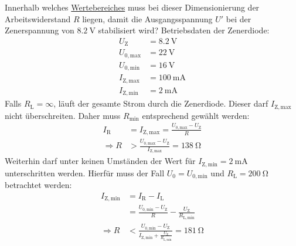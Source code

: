 \documentclass{article}
\theoremstyle{definition}
\begin{document}
\begin{voraufgabe}{Innerhalb welches \underline{Wertebereiches} muss bei dieser Dimensionierung der Arbeitswiderstand $R$ liegen, damit die Ausgangsspannung $U'$ bei der Zenerspannung von $\SI{8.2}{\volt}$ stabilisiert wird?}
    Betriebsdaten der Zenerdiode:
    \begin{align*}
        U_\mathrm{Z}&=\SI{8.2}{\volt}\\
        U_\mathrm{0,max}&=\SI{22}{\volt}\\
        U_\mathrm{0,min}&=\SI{16}{\volt}\\
        I_\mathrm{Z,max}&=\SI{100}{\milli\ampere}\\
        I_\mathrm{Z,min}&=\SI{2}{\milli\ampere}
    \end{align*}
    Falls $R_\mathrm{L}=\infty$, läuft der gesamte Strom durch die Zenerdiode. Dieser darf $I_\mathrm{Z,max}$ nicht überschreiten. Daher muss $R_\mathrm{min}$ entsprechend gewählt werden:
    \begin{align*}
        I_\mathrm{R}&=I_\mathrm{Z,max}=\frac{U_\mathrm{0,max}-U_\mathrm{Z}}{R}\\
        \Rightarrow R&>\frac{U_\mathrm{0,max}-U_\mathrm{Z}}{I_\mathrm{Z,max}}=\SI{138}{\ohm}
    \end{align*}
    Weiterhin darf unter keinen Umständen der Wert für $I_\mathrm{Z,min}=\SI{2}{\milli\ampere}$ unterschritten werden. Hierfür muss der Fall $U_0=U_\mathrm{0,min}$ und $R_\mathrm{L}=\SI{200}{\ohm}$ betrachtet werden:
    \begin{align*}
        I_\mathrm{Z,min} &= I_\mathrm{R}-I_\mathrm{L} \\
        &= \frac{U_\mathrm{0,min}-U_\mathrm{Z}}{R}-\frac{U_\mathrm{Z}}{R_\mathrm{L,min}} \\
        \Rightarrow R &< \frac{U_\mathrm{0,min}-U_\mathrm{Z}}{I_\mathrm{Z,min}+\frac{U_\mathrm{Z}}{R_\mathrm{L,min}}} = \SI{181}{\ohm}
    \end{align*} 
    \label{VoraufgabeK}   
\end{voraufgabe}


\clearpage
\end{document}
